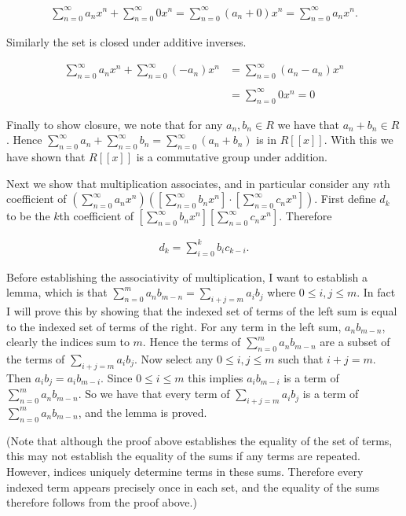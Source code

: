 \documentclass{article}
\begin{document}
  \begin{align*}
    \sum_{n=0}^\infty a_nx^n+\sum_{n=0}^\infty 0x^n = \sum_{n=0}^\infty (a_n+0)x^n = \sum_{n=0}^\infty a_nx^n.
  \end{align*}

  Similarly the set is closed under additive inverses.

  \begin{align*}
    \sum_{n=0}^\infty a_nx^n + \sum_{n=0}^\infty (-a_n)x^n &= \sum_{n=0}^\infty (a_n-a_n)x^n \\\\
    &= \sum_{n=0}^\infty 0x^n = 0
  \end{align*}

  Finally to show closure, we note that for any $a_n,b_n\in R$ we have that $a_n+b_n\in R$.  Hence $\displaystyle \sum_{n=0}^\infty a_n+\sum_{n=0}^\infty b_n = \sum_{n=0}^\infty (a_n+b_n)$ is in $R[[x]]$.  With this we have shown that $R[[x]]$ is a commutative group under addition.

  Next we show that multiplication associates, and in particular consider any $n$th coefficient of $\displaystyle \left(\sum_{n=0}^\infty a_nx^n\right)\left(\left[\sum_{n=0}^\infty b_nx^n\right]\cdot \left[\sum_{n=0}^\infty c_nx^n\right]\right)$.  First define $d_k$ to be the $k$th coefficient of $\displaystyle\left[\sum_{n=0}^\infty b_nx^n\right]\left[\sum_{n=0}^\infty c_nx^n\right]$.  Therefore

  \begin{align*}
    d_k = \sum_{i=0}^k b_ic_{k-i}.
  \end{align*}

  Before establishing the associativity of multiplication, I want to establish a lemma, which is that $\displaystyle\sum_{n=0}^m a_nb_{m-n} = \sum_{i+j=m}a_ib_j$ where $0\leq i,j\leq m$.  In fact I will prove this by showing that the indexed set of terms of the left sum is equal to the indexed set of terms of the right.  For any term in the left sum, $a_nb_{m-n}$, clearly the indices sum to $m$.  Hence the terms of $\displaystyle\sum_{n=0}^m a_nb_{m-n}$ are a subset of the terms of $\displaystyle \sum_{i+j=m}a_ib_j$.  Now select any $0\leq i,j\leq m$ such that $i+j=m$.  Then $a_ib_j = a_ib_{m-i}$.  Since $0\leq i\leq m$ this implies $a_ib_{m-i}$ is a term of $\displaystyle\sum_{n=0}^m a_nb_{m-n}$.  So we have that every term of $\displaystyle \sum_{i+j=m}a_ib_j$ is a term of $\displaystyle\sum_{n=0}^m a_nb_{m-n}$, and the lemma is proved.

  (Note that although the proof above establishes the equality of the set of terms, this may not establish the equality of the sums if any terms are repeated.  However, indices uniquely determine terms in these sums.  Therefore every indexed term appears precisely once in each set, and the equality of the sums therefore follows from the proof above.)
\end{document}
